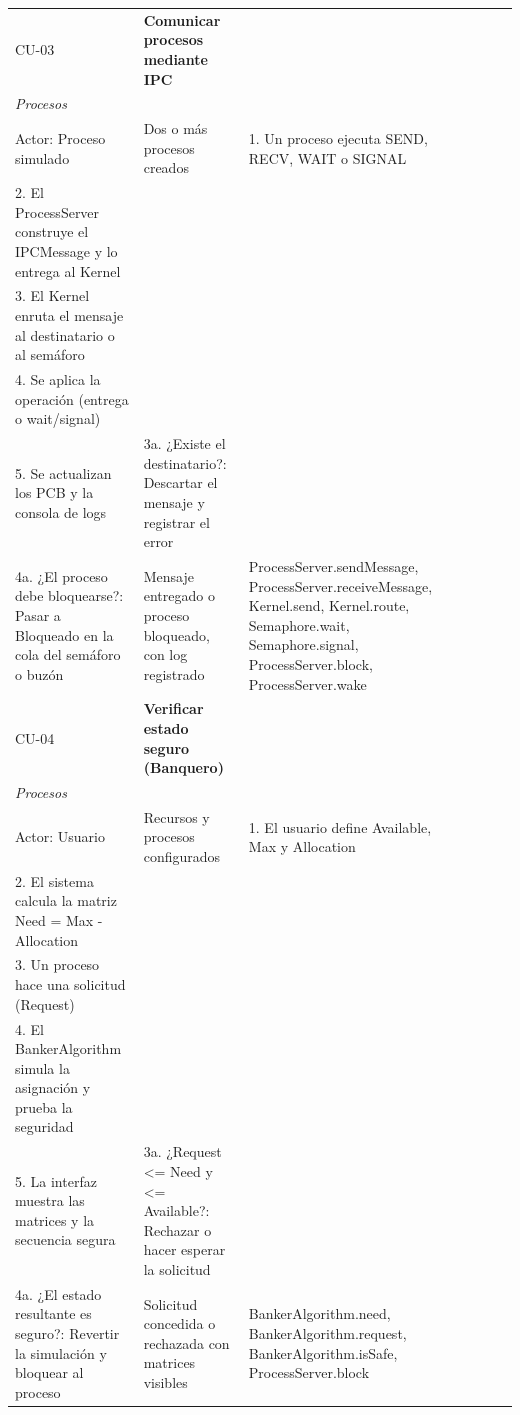 \documentclass[conference]{IEEEtran}
\begin{document}
\begin{table}[!t]
\begin{tabular}{|>{\raggedright}p{0.8cm}|>{\raggedright}p{2.1cm}|>{\raggedright}p{1.7cm}|>{\raggedright}p{4.7cm}|>{\raggedright}p{2.9cm}|>{\raggedright}p{1.8cm}|>{\raggedright}p{2.9cm}|}
CU-03 & \textbf{Comunicar procesos mediante IPC}\\ \textit{Procesos}\\ Actor: Proceso simulado & Dos o más procesos creados & 1. Un proceso ejecuta SEND, RECV, WAIT o SIGNAL\\ 2. El ProcessServer construye el IPCMessage y lo entrega al Kernel\\ 3. El Kernel enruta el mensaje al destinatario o al semáforo\\ 4. Se aplica la operación (entrega o wait/signal)\\ 5. Se actualizan los PCB y la consola de logs & 3a. ¿Existe el destinatario?: Descartar el mensaje y registrar el error\\ 4a. ¿El proceso debe bloquearse?: Pasar a Bloqueado en la cola del semáforo o buzón & Mensaje entregado o proceso bloqueado, con log registrado & ProcessServer.\allowbreak sendMessage, ProcessServer.\allowbreak receiveMessage, Kernel.\allowbreak send, Kernel.\allowbreak route, Semaphore.\allowbreak wait, Semaphore.\allowbreak signal, ProcessServer.\allowbreak block, ProcessServer.\allowbreak wake\tabularnewline \hline
CU-04 & \textbf{Verificar estado seguro (Banquero)}\\ \textit{Procesos}\\ Actor: Usuario & Recursos y procesos configurados & 1. El usuario define Available, Max y Allocation\\ 2. El sistema calcula la matriz Need = Max - Allocation\\ 3. Un proceso hace una solicitud (Request)\\ 4. El BankerAlgorithm simula la asignación y prueba la seguridad\\ 5. La interfaz muestra las matrices y la secuencia segura & 3a. ¿Request \textless{}= Need y \textless{}= Available?: Rechazar o hacer esperar la solicitud\\ 4a. ¿El estado resultante es seguro?: Revertir la simulación y bloquear al proceso & Solicitud concedida o rechazada con matrices visibles & BankerAlgorithm.\allowbreak need, BankerAlgorithm.\allowbreak request, BankerAlgorithm.\allowbreak isSafe, ProcessServer.\allowbreak block\tabularnewline \hline

\end{tabular}
\end{table}
\end{document}
